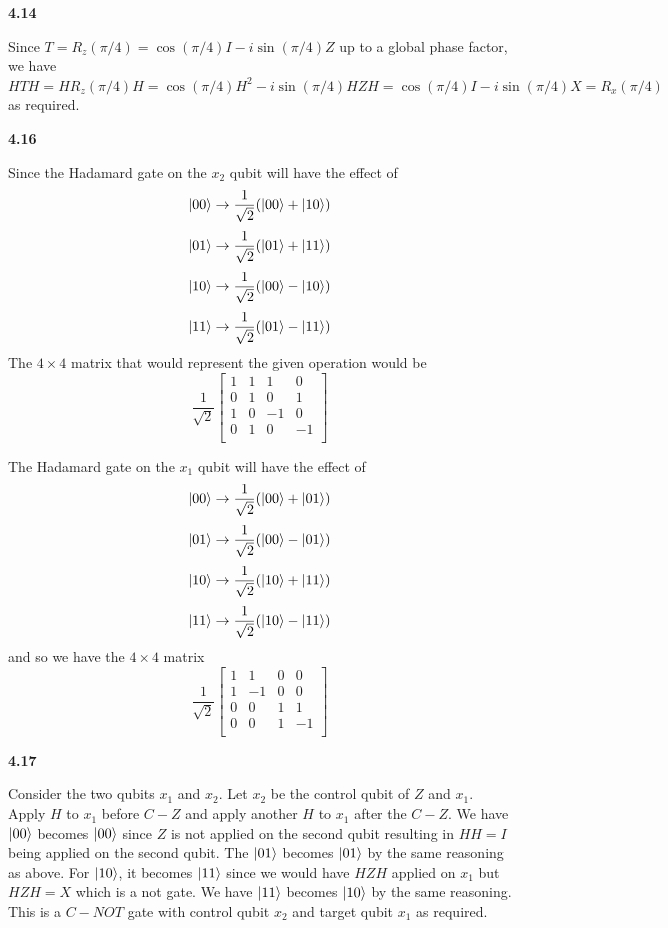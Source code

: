 \textbf{4.14}

Since $T = R_z(\pi/4) = \cos(\pi/4)I - i\sin(\pi/4)Z$ up to a global phase factor, we have $HTH =HR_z(\pi/4)H=\cos(\pi/4)H^2 - i\sin(\pi/4)HZH =\cos(\pi/4)I - i\sin(\pi/4)X = R_x(\pi/4)$ as required.

\textbf{4.16}

Since the Hadamard gate on the $x_2$ qubit will have the effect of 
\[\ket{00}\rightarrow \frac{1}{\sqrt{2}}(\ket{00} + \ket{10})\]
\[\ket{01}\rightarrow \frac{1}{\sqrt{2}}(\ket{01} + \ket{11})\]
\[\ket{10}\rightarrow \frac{1}{\sqrt{2}}(\ket{00} - \ket{10})\]
\[\ket{11}\rightarrow \frac{1}{\sqrt{2}}(\ket{01} - \ket{11})\]
The $4\times 4$ matrix that would represent the given operation would be 
\[\frac{1}{\sqrt{2}}\begin{bmatrix}
    1 & 1 & 1 & 0 \\
    0& 1 & 0 & 1\\
    1 & 0 & -1 & 0 \\
    0 & 1 & 0 & -1\\
\end{bmatrix}\]

The Hadamard gate on the $x_1$ qubit will have the effect of 
\[\ket{00}\rightarrow \frac{1}{\sqrt{2}}(\ket{00} + \ket{01})\]
\[\ket{01}\rightarrow \frac{1}{\sqrt{2}}(\ket{00} - \ket{01})\]
\[\ket{10}\rightarrow \frac{1}{\sqrt{2}}(\ket{10} + \ket{11})\]
\[\ket{11}\rightarrow \frac{1}{\sqrt{2}}(\ket{10} - \ket{11})\]
 and so we have the $4\times 4$ matrix
\[\frac{1}{\sqrt{2}}\begin{bmatrix}
    1 & 1 & 0 & 0 \\
    1& -1 & 0 & 0\\
    0 & 0 & 1 & 1 \\
    0 & 0 & 1 & -1\\
\end{bmatrix}\]

\textbf{4.17}

Consider the two qubits $x_1$ and $x_2$. Let $x_2$ be the control qubit of $ Z$ and $x_1$. Apply $H$ to $x_1$ before $C-Z$ and apply another $H$ to $x_1$ after the $C-Z$. 
We have $\ket{00} $ becomes $\ket{00}$ since $Z$ is not applied on the second qubit resulting in $HH = I$ being applied on the second qubit. The $\ket{01}$ becomes $ \ket{01}$ by the same reasoning as above. For $\ket{10}$, it becomes $\ket{11}$ since we would have $HZH$ applied on $x_1$ but $HZH = X$ which is a not gate. We have $\ket{11}$ becomes $\ket{10}$ by the same reasoning.
This is a $C-NOT$ gate with control qubit $x_2$ and target qubit $ x_1$ as required.

